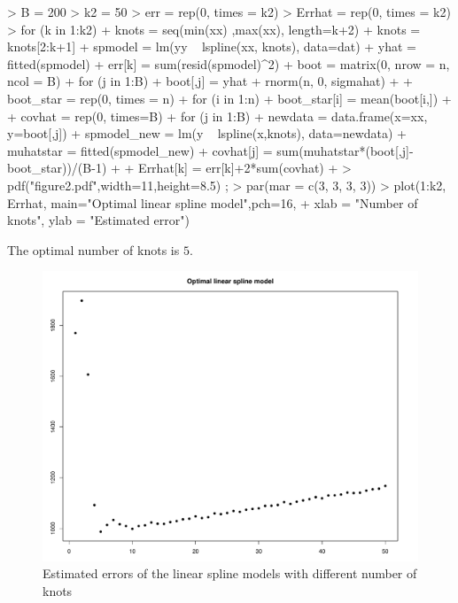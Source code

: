 \documentclass[12pt]{article}
\begin{document}
\begin{Schunk}
\begin{Sinput}
> B = 200
> k2 = 50
> err = rep(0, times = k2)
> Errhat = rep(0, times = k2)
> for (k in 1:k2){
+   knots = seq(min(xx) ,max(xx), length=k+2)
+   knots = knots[2:k+1]
+   spmodel = lm(yy ~ lspline(xx, knots), data=dat)
+   yhat = fitted(spmodel)
+   err[k] = sum(resid(spmodel)^2)
+   boot = matrix(0, nrow = n, ncol = B)
+   for (j in 1:B){
+     boot[,j] = yhat + rnorm(n, 0, sigmahat)
+   }
+   boot_star = rep(0, times = n)
+   for (i in 1:n){
+     boot_star[i] = mean(boot[i,])
+   }
+   covhat = rep(0, times=B)
+   for (j in 1:B){
+     newdata = data.frame(x=xx, y=boot[,j])
+     spmodel_new = lm(y ~ lspline(x,knots), data=newdata)
+     muhatstar = fitted(spmodel_new)
+     covhat[j] = sum(muhatstar*(boot[,j]-boot_star))/(B-1)
+   }
+   Errhat[k] = err[k]+2*sum(covhat)
+ }
> pdf("figure2.pdf",width=11,height=8.5) ;
> par(mar = c(3, 3, 3, 3)) 
> plot(1:k2, Errhat, main="Optimal linear spline model",pch=16,
+      xlab = "Number of knots", ylab = "Estimated error")
\end{Sinput}
\end{Schunk}
The optimal number of knots is $5$.
\begin{figure}
\begin{center}
\caption{Estimated errors of the linear spline models with different number of knots}
\includegraphics[scale=0.50]{figure2}
\end{center}
\end{figure}
\end{document}

